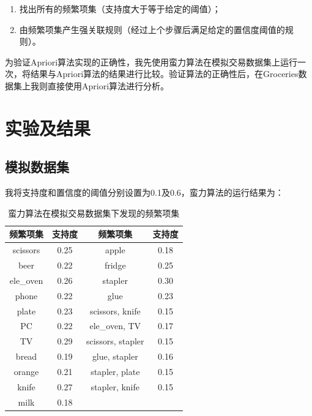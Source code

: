 \documentclass[12pt,a4paper]{article}
\theoremstyle{definition}
\begin{document}
\begin{enumerate}

\item 找出所有的频繁项集（支持度大于等于给定的阈值）；

\item 由频繁项集产生强关联规则（经过上个步骤后满足给定的置信度阈值的规则）。

\end{enumerate}

为验证Apriori算法实现的正确性，我先使用蛮力算法在模拟交易数据集上运行一次，将结果与Apriori算法的结果进行比较。验证算法的正确性后，在Groceries数据集上我则直接使用Apriori算法进行分析。


\section{实验及结果}

\subsection{模拟数据集}

我将支持度和置信度的阈值分别设置为0.1及0.6，蛮力算法的运行结果为：

\begin{table}[H]
	\renewcommand\arraystretch{1.35}
	\caption{蛮力算法在模拟交易数据集下发现的频繁项集}
	\label{tab:baoli_sim_sup}
	\centering
	
	\begin{tabular}{c|c|c|c}
		\centering
		频繁项集 & 支持度 & 频繁项集 & 支持度 \\
		\hline
		scissors & 0.25 & apple & 0.18 \\
		beer & 0.22 & fridge & 0.25 \\
		ele\_oven & 0.26 & stapler & 0.30 \\
		phone & 0.22 & glue & 0.23 \\
		plate & 0.23 & scissors, knife & 0.15 \\
		PC & 0.22 & ele\_oven, TV & 0.17 \\
		TV & 0.29 & scissors, stapler & 0.15 \\
		bread & 0.19 & glue, stapler & 0.16 \\
		orange & 0.21 & stapler, plate & 0.15 \\
		knife & 0.27 & stapler, knife & 0.15 \\
		milk & 0.18 & & \\		
	\end{tabular}
\end{table}
\end{document}
